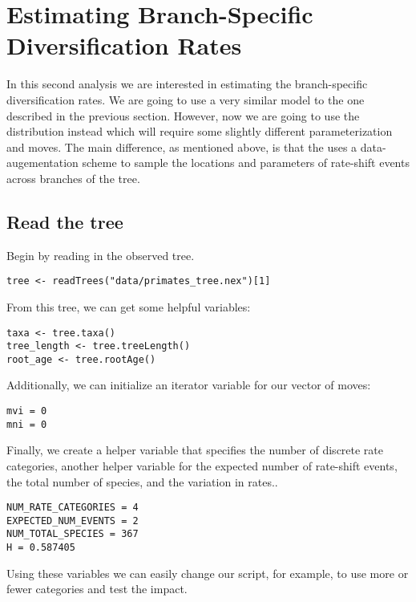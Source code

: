 







\bigskip
\section{Estimating Branch-Specific Diversification Rates}

In this second analysis we are interested in estimating the branch-specific diversification rates.
We are going to use a very similar model to the one described in the previous section.
However, now we are going to use the  distribution instead which will require some slightly different parameterization and moves.
The main difference, as mentioned above, is that the  uses a data-augementation scheme to sample the locations and parameters of rate-shift events across branches of the tree.

\subsection{Read the tree}

Begin by reading in the observed tree.

{\tt \begin{snugshade*}
\begin{lstlisting}
tree <- readTrees("data/primates_tree.nex")[1]
\end{lstlisting}
\end{snugshade*}}

From this tree, we can get some helpful variables:
{\tt \begin{snugshade*}
\begin{lstlisting}
taxa <- tree.taxa()
tree_length <- tree.treeLength()
root_age <- tree.rootAge()
\end{lstlisting}
\end{snugshade*}}

Additionally, we can initialize an iterator variable for our vector of moves:
{\tt \begin{snugshade*}
\begin{lstlisting}
mvi = 0
mni = 0
\end{lstlisting}
\end{snugshade*}}

Finally, we create a helper variable that specifies the number of discrete rate categories, another helper variable for the expected number of rate-shift events, the total number of species, and the variation in rates..
{\tt \begin{snugshade*}
\begin{lstlisting}
NUM_RATE_CATEGORIES = 4
EXPECTED_NUM_EVENTS = 2
NUM_TOTAL_SPECIES = 367
H = 0.587405
\end{lstlisting}
\end{snugshade*}}
Using these variables we can easily change our script, for example, to use more or fewer categories and test the impact.



